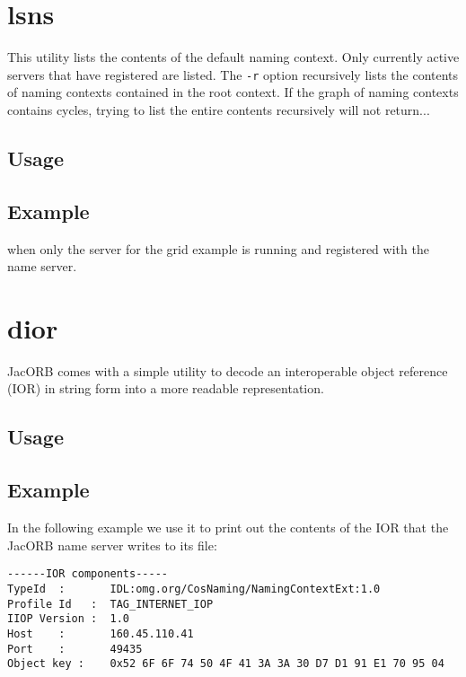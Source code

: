 \documentclass[12pt]{scrbook}
\begin{document}

\section{lsns}

This utility  lists the contents  of the default naming  context. Only
currently active servers that have registered are listed. The {\tt -r}
option recursively lists the  contents of naming contexts contained in
the root  context. If  the graph of  naming contexts  contains cycles,
trying to list the entire contents recursively will not return...

\subsection*{Usage}



\subsection*{Example}


when only the server for the grid example is running and registered
with the name server.


\section{dior}

JacORB comes with a simple utility to decode an interoperable object reference
(IOR) in string form into a more readable representation.

\subsection*{Usage}


\subsection*{Example}

In the following example we use it to print out the contents of the
IOR that the JacORB name server writes to its file:

\small{\begin{verbatim}
------IOR components-----
TypeId  :       IDL:omg.org/CosNaming/NamingContextExt:1.0
Profile Id   :  TAG_INTERNET_IOP
IIOP Version :  1.0
Host    :       160.45.110.41
Port    :       49435
Object key :    0x52 6F 6F 74 50 4F 41 3A 3A 30 D7 D1 91 E1 70 95 04
\end{verbatim}
}
\end{document}
